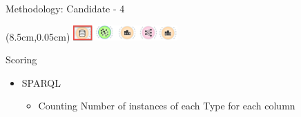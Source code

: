 \documentclass{beamer}
\begin{document}
\begin{frame}{Methodology: Candidate - 4}
	\begin{textblock*}{4cm}(8.5cm,0.05cm) %
		\includegraphics[width=4cm]{images/header-candidate.png}
	\end{textblock*}
	Scoring
	\begin{itemize}
		\item SPARQL
		\begin{itemize}
			\item Counting Number of instances of each Type for each column
		\end{itemize}
	\end{itemize}
\end{frame}
\end{document}
